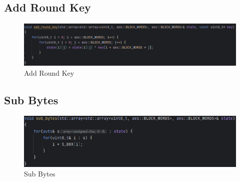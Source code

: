 

\subsection{Add Round Key}


\begin{figure}[H]
	\centering
	\includegraphics[width=1\textwidth, height=1\textheight, keepaspectratio]{./images/code/cpp/encryption/add_round_key.PNG}
	\caption{Add Round Key}
	\label{fig:add_round_key}
\end{figure}

\textsf{\small } %

\subsection{Sub Bytes}

\begin{figure}[H]
	\centering
	\includegraphics[width=1\textwidth, height=1\textheight, keepaspectratio]{./images/code/cpp/encryption/sub_bytes.PNG}
	\caption{Sub Bytes}
	\label{fig:sub_bytes}
\end{figure}

\textsf{\small } %


